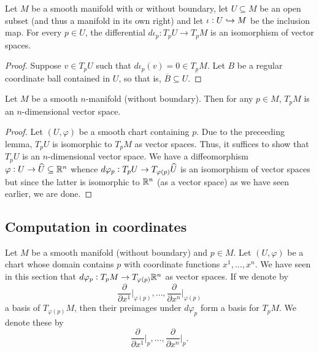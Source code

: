 \begin{lemma}
    Let $M$ be a smooth manifold with or without boundary, let $U\subseteq M$ be an open subset (and thus a manifold in its own right) and let $\iota: U\hookrightarrow M$ be the inclusion map. For every $p\in U$, the differential $d\iota_p: T_pU\to T_pM$ is an isomorphism of vector spaces.
\end{lemma}
\begin{proof}
    Suppose $v\in T_pU$ such that $d\iota_p(v) = 0\in T_pM$. Let $B$ be a regular coordinate ball contained in $U$, so that is, $\overline B\subseteq U$. 
\end{proof}

\begin{proposition}
    Let $M$ be a smooth $n$-manifold (without boundary). Then for any $p\in M$, $T_pM$ is an $n$-dimensional vector space.
\end{proposition}
\begin{proof}
    Let $(U,\varphi)$ be a smooth chart containing $p$. Due to the preceeding lemma, $T_pU$ is isomorphic to $T_pM$ as vector spaces. Thus, it suffices to show that $T_pU$ is an $n$-dimensional vector space. We have a diffeomorphism $\varphi: U\to\widehat{U}\subseteq\mathbb{R}^n$ whence $d\varphi_p: T_pU\to T_{\varphi(p)}\widehat{U}$ is an isomorphism of vector spaces but since the latter is isomorphic to $\mathbb{R}^n$ (as a vector space) as we have seen earlier, we are done.
\end{proof}


\subsection{Computation in coordinates}

Let $M$ be a smooth manifold (without boundary) and $p\in M$. Let $(U,\varphi)$ be a chart whose domain contains $p$ with coordinate functions $x^1,\dots,x^n$. We have seen in this section that $d\varphi_p: T_pM\to T_{\varphi(p)}\mathbb{R}^n$ as vector spaces. If we denote by 
\begin{equation*}
    \frac{\partial}{\partial x^1}\bigg\vert_{\varphi(p)},\dots,\frac{\partial}{\partial x^n}\bigg\vert_{\varphi(p)}
\end{equation*}
a basis of $T_{\varphi(p)}M$, then their preimages under $d\varphi_p$ form a basis for $T_pM$. We denote these by 
\begin{equation*}
    \frac{\partial}{\partial x^1}\bigg\vert_{p},\dots,\frac{\partial}{\partial x^n}\bigg\vert_p.
\end{equation*}

